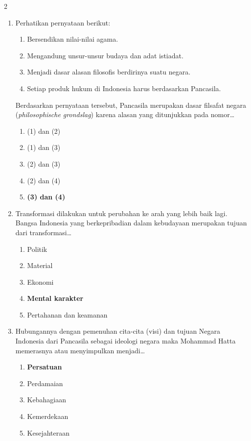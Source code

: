 \documentclass[10pt,a4paper]{article}
\begin{document}
\begin{multicols}{2}
\begin{enumerate}
  \item Perhatikan pernyataan berikut:
    \begin{enumerate}[label=(\arabic*)]
    \item Bersendikan nilai-nilai agama.
    \item Mengandung unsur-unsur budaya dan adat istiadat.
    \item Menjadi dasar alasan filosofis berdirinya suatu negara.
    \item Setiap produk hukum di Indonesia harus berdasarkan Pancasila.
    \end{enumerate}
    Berdasarkan pernyataan tersebut, Pancasila merupakan dasar filsafat negara (\textit{philosophische grondslag}) karena alasan yang ditunjukkan pada nomor\dots
    \begin{enumerate}
    \item (1) dan (2)
    \item (1) dan (3)
    \item (2) dan (3)
    \item (2) dan (4)
    \item \textbf{(3) dan (4)}
    \end{enumerate}

  \item Transformasi dilakukan untuk perubahan ke arah yang lebih baik lagi. Bangsa Indonesia yang berkepribadian dalam kebudayaan merupakan tujuan dari transformasi\dots
    \begin{enumerate}
    \item Politik
    \item Material
    \item Ekonomi
    \item \textbf{Mental karakter}
    \item Pertahanan dan keamanan
    \end{enumerate}

  \item Hubungannya dengan pemenuhan cita-cita (visi) dan tujuan Negara Indonesia dari Pancasila sebagai ideologi negara maka Mohammad Hatta memerasnya atau menyimpulkan menjadi\dots
    \begin{enumerate}
    \item \textbf{Persatuan}
    \item Perdamaian
    \item Kebahagiaan
    \item Kemerdekaan
    \item Kesejahteraan
    \end{enumerate}


\end{enumerate}
\end{multicols}
\end{document}
